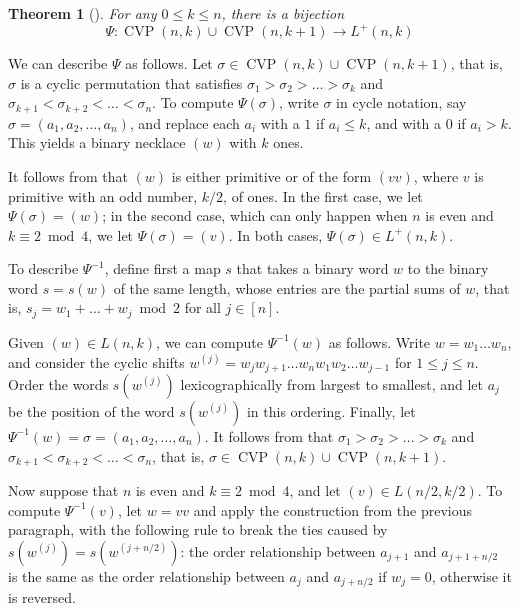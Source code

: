 \documentclass[12pt]{article}
\DeclareMathOperator{\CVP}{CVP}
\newtheorem{theorem}{Theorem}[section]
\theoremstyle{definition}
\begin{document}
\begin{theorem}[\cite{Ste,ArcEli}]\label{thm:ArcEli}
    For any $0\le k\le n$, there is a bijection 
    \begin{equation}\label{eq:AEbij} \Psi:\CVP(n,k)\cup\CVP(n,k+1)\to L^+(n,k)\end{equation} 
\end{theorem}

We can describe $\Psi$ as follows.  Let $\sigma\in \CVP(n,k)\cup\CVP(n,k+1)$, that is, $\sigma$ is a cyclic permutation that satisfies $\sigma_1>\sigma_2>\dots>\sigma_k$ and $\sigma_{k+1}<\sigma_{k+2}<\dots<\sigma_n$.
To compute $\Psi(\sigma)$, write $\sigma$ in cycle notation, say $\sigma=(a_1,a_2,\dots,a_n)$, and replace each $a_i$ with a $1$ if $a_i\le k$, and with a $0$ if $a_i>k$. This yields a binary necklace $(w)$ with $k$ ones.

It follows from \cite[Thm.~2.2]{Ste} that $(w)$ is either primitive or of the form $(vv)$, where $v$ is primitive with an odd number, $k/2$, of ones. 
In the first case, we let $\Psi(\sigma)=(w)$; in the second
case, which can only happen when $n$ is even and $k\equiv2\bmod4$, we let $\Psi(\sigma)=(v)$. In both cases, $\Psi(\sigma)\in L^+(n,k)$.

To describe $\Psi^{-1}$, define first a map $s$ that takes a binary word $w$ to the binary word $s=s(w)$ of the same length, whose entries are the partial sums of $w$, that is, $s_j=w_1+\dots+w_j\bmod 2$ for all $j\in[n]$.

Given $(w)\in L(n,k)$, we can compute $\Psi^{-1}(w)$ as follows. Write $w=w_1\dots w_n$, and consider the cyclic shifts $w^{(j)}=w_jw_{j+1}\dots w_nw_1w_2\dots w_{j-1}$ for $1\le j\le n$. Order the words $s(w^{(j)})$ lexicographically from largest to smallest, and let $a_j$ be the position of the word $s(w^{(j)})$ in this ordering. Finally, let $\Psi^{-1}(w)=\sigma=(a_1,a_2,\dots,a_n)$. It follows from \cite{Ste,ArcEli} that $\sigma_1>\sigma_2>\dots>\sigma_{k}$
and $\sigma_{k+1}<\sigma_{k+2}<\dots<\sigma_n$, that is, $\sigma\in \CVP(n,k)\cup\CVP(n,k+1)$. 

Now suppose that $n$ is even and $k\equiv 2\bmod 4$, and let $(v)\in L(n/2,k/2)$. To compute $\Psi^{-1}(v)$, let $w=vv$ and apply the construction from the previous paragraph, with the following rule to break the ties caused by $s(w^{(j)})=s(w^{(j+n/2)})$: the order relationship between $a_{j+1}$ and $a_{j+1+n/2}$ is the same as the order relationship between $a_{j}$ and $a_{j+n/2}$ if $w_j=0$, otherwise it is reversed.
\end{document}
